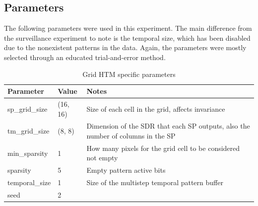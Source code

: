 \subsection{Parameters}
The following parameters were used in this experiment. The main difference from the surveillance experiment to note is the temporal size, which has been disabled due to the nonexistent patterns in the data. Again, the parameters were mostly selected through an educated trial-and-error method.
\begin{table}[H]
    \centering
    \begin{tabularx}{\linewidth}{@{}XlX@{}}
        \toprule
        \textbf{Parameter} & \textbf{Value} & \textbf{Notes}                                                                  \\
        \midrule
        sp\_grid\_size     & (16, 16)       & Size of each cell in the grid, affects invariance                               \\
        tm\_grid\_size     & (8, 8)         & Dimension of the SDR that each SP outputs, also the number of columns in the SP \\
        min\_sparsity      & 1              & How many pixels for the grid cell to be considered not empty                    \\
        sparsity           & 5              & Empty pattern active bits                                                       \\
        temporal\_size     & 1              & Size of the multistep temporal pattern buffer                                   \\
        seed               & 2              &                                                                                 \\
        \bottomrule
    \end{tabularx}
    \caption{Grid HTM specific parameters}
    \label{tab:sperm_params}
\end{table}

